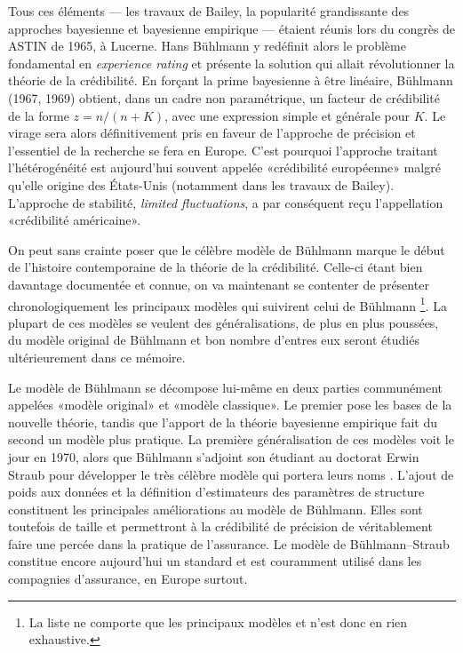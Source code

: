 Tous ces éléments --- les travaux de Bailey, la popularité
grandissante des approches bayesienne et bayesienne empirique ---
étaient réunis lors du con\-grès de ASTIN de 1965, à Lucerne. Hans
Bühlmann y redéfinit alors le problème fondamental en \emph{experience
  rating} et présente la solution qui allait révolutionner la théorie
de la crédibilité. En forçant la prime bayesienne à être linéaire,
Bühlmann (1967, 1969) obtient, dans un cadre non paramétrique, un
facteur de crédibilité de la forme $z = n/(n+K)$, avec une expression
simple et générale pour $K$. Le virage sera alors définitivement pris
en faveur de l'approche de précision et l'essentiel de la recherche se
fera en Europe. C'est pourquoi l'approche traitant l'hétérogénéité est
aujourd'hui souvent appelée «crédibilité européenne» malgré qu'elle
origine des États-Unis (notamment dans les travaux de Bailey).
L'approche de stabilité, \emph{limited fluctuations}, a par conséquent
reçu l'appellation «crédibilité américaine».

On peut sans crainte poser que le célèbre modèle de Bühlmann
marque le début de l'histoire contemporaine de la théorie de la
crédibilité. Celle-ci étant bien davantage documentée et connue, on va
maintenant se contenter de présenter chronologiquement les principaux
modèles qui suivirent celui de Bühlmann%
\footnote{La liste ne comporte que les principaux modèles et n'est
  donc en rien exhaustive.}. %
La plupart de ces modèles se veulent des généralisations, de plus en
plus poussées, du modèle original de Bühlmann et bon nombre d'entres
eux seront étudiés ultérieurement dans ce mémoire.

Le modèle de Bühlmann se décompose lui-même en deux parties
communément appelées «modèle original» et «modèle classique». Le
premier pose les bases de la nouvelle théorie, tandis que l'apport de
la théorie bayesienne empirique fait du second un modèle plus
pratique. La première généralisation de ces modèles voit le jour en
1970, alors que Bühlmann s'adjoint son étudiant au doctorat Erwin
Straub pour développer le très célèbre modèle qui portera leurs noms
\citep{BuhlmannStraub:1970}. L'ajout de poids aux données et la
définition d'estimateurs des paramètres de structure constituent les
principales améliorations au modèle de Bühlmann. Elles sont toutefois
de taille et permettront à la crédibilité de précision de
véritablement faire une percée dans la pratique de l'assurance. Le
modèle de Bühlmann--Straub constitue encore aujourd'hui un standard et
est couramment utilisé dans les compagnies d'assurance, en Europe
surtout.

